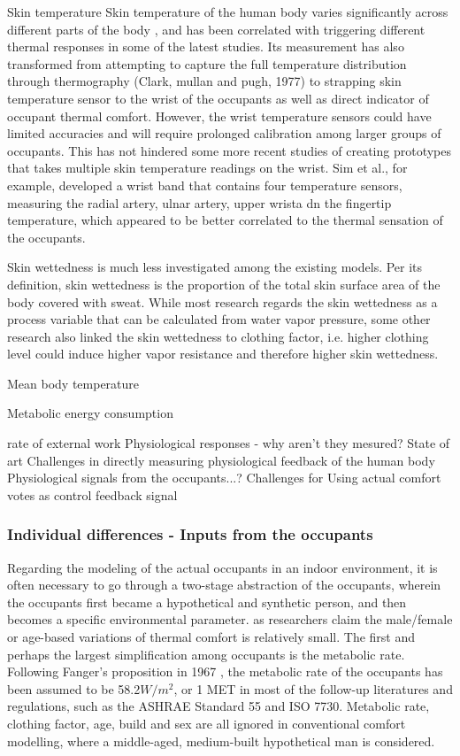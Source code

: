 	Skin temperature
	Skin temperature of the human body varies significantly across different parts of the body \cite{choi_cobi:_2010}, and has been correlated with triggering different thermal responses in some of the latest studies. Its measurement has also transformed from attempting to capture the full temperature distribution through thermography (Clark, mullan and pugh, 1977) to strapping skin temperature sensor to the wrist of the occupants \cite{choi_investigation_2017,liu_personal_2019} as well as direct indicator of occupant thermal comfort. However, the wrist temperature sensors could have limited accuracies \cite{mccarthy_validation_2016} and will require prolonged calibration among larger groups of occupants. This has not hindered some more recent studies of creating prototypes that takes multiple skin temperature readings on the wrist. Sim et al., for example, developed a wrist band that contains four temperature sensors, measuring the radial artery, ulnar artery, upper wrista dn the fingertip temperature, which appeared to be better correlated to the thermal sensation of the occupants.

	Skin wettedness is much less investigated among the existing models. Per its definition, skin wettedness is the proportion of the total skin surface area of the body covered with sweat. While most research regards the skin wettedness as a process variable that can be calculated from water vapor pressure\cite{doherty_evaluation_1988}, some other research also linked the skin wettedness to clothing factor, i.e. higher clothing level could induce higher vapor resistance and therefore higher skin wettedness. 

	Mean body temperature

	Metabolic energy consumption

	rate of external work
        Physiological responses - why aren't they mesured?
        State of art
        Challenges in directly measuring physiological feedback of the human body
	Physiological signals from the occupants...?
	    Challenges for Using actual comfort votes as control feedback signal

\subsubsection{Individual differences - Inputs from the occupants}
	Regarding the modeling of the actual occupants in an indoor environment, it is often necessary to go through a two-stage abstraction of the occupants, wherein the occupants first became a hypothetical and synthetic person, and then becomes a specific environmental parameter.  as researchers claim the male/female or age-based variations of thermal comfort is relatively small. 
	The first and perhaps the largest simplification among occupants is the metabolic rate. Following Fanger's proposition in 1967 \cite{fanger_calculation_1967}, the metabolic rate of the occupants has been assumed to be 58.2$W/m^2$, or 1 MET in most of the follow-up literatures and regulations, such as the ASHRAE Standard 55\cite{ashrae_ansi/ashrae_2013} and ISO 7730\cite{iso_iso_2005}. 
        Metabolic rate, clothing factor, age, build and sex are all ignored in conventional comfort modelling, where a middle-aged, medium-built hypothetical man is considered.
